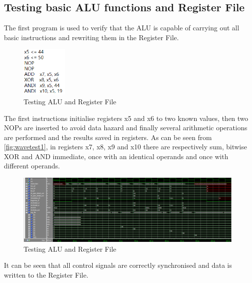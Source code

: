 \subsection{Testing basic ALU functions and Register File}
The first program is used to verify that the ALU is capable of carrying out all basic instructions and rewriting them in the Register File.
\begin{figure}[H]
	\centering
	\includegraphics[width=0.2\textwidth]{sec3/images/test1.png}
	\caption{Testing ALU and Register File}
	\label{fig:test1}
\end{figure}
\noindent The first instructions initialise registers x5 and x6 to two known values, then two NOPs are inserted to avoid data hazard and finally several arithmetic operations are performed and the results saved in registers. As can be seen from \autoref{fig:wavetest1}, in registers x7, x8, x9 and x10 there are respectively sum, bitwise XOR and AND immediate, once with an identical operands and once with  different operands.\\
\begin{figure}[H]
	\centering
	\includegraphics[width=1\textwidth]{sec3/images/wave_test1.png}
	\caption{Testing ALU and Register File}
	\label{fig:wavetest1}
\end{figure}
\noindent It can be seen that all control signals are correctly synchronised and data is written to the Register File.
\pagebreak

